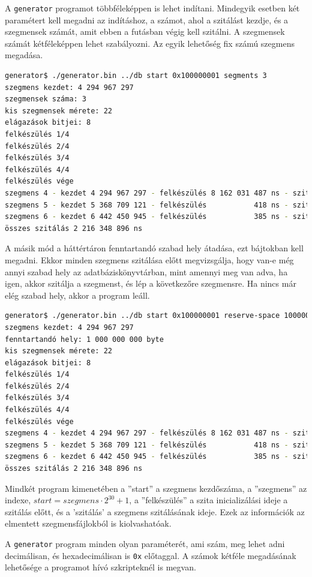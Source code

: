 A \texttt{generator} programot többféleképpen is lehet indítani.
Mindegyik esetben két paramétert kell megadni az indításhoz, a számot, ahol a szitálást kezdje, és a szegmensek számát, amit ebben a futásban végig kell szitálni.
A szegmensek számát kétféleképpen lehet szabályozni.
Az egyik lehetőség fix számú szegmens megadása.

\begin{lstlisting}[language=bash]
generator$ ./generator.bin ../db start 0x100000001 segments 3
szegmens kezdet: 4 294 967 297
szegmensek száma: 3
kis szegmensek mérete: 22
elágazások bitjei: 8
felkészülés 1/4
felkészülés 2/4
felkészülés 3/4
felkészülés 4/4
felkészülés vége
szegmens 4 - kezdet 4 294 967 297 - felkészülés 8 162 031 487 ns - szitálás 729 914 370 ns
szegmens 5 - kezdet 5 368 709 121 - felkészülés           418 ns - szitálás 736 412 117 ns
szegmens 6 - kezdet 6 442 450 945 - felkészülés           385 ns - szitálás 750 022 409 ns
összes szitálás 2 216 348 896 ns
\end{lstlisting}

A másik mód a háttértáron fenntartandó szabad hely átadása, ezt bájtokban kell megadni.
Ekkor minden szegmens szitálása előtt megvizsgálja, hogy van-e még annyi szabad hely az adatbáziskönyvtárban, mint amennyi meg van adva, ha igen, akkor szitálja a szegmenst,
és lép a következőre szegmensre. Ha nincs már elég szabad hely, akkor a program leáll.

\begin{lstlisting}[language=bash]
generator$ ./generator.bin ../db start 0x100000001 reserve-space 1000000000
szegmens kezdet: 4 294 967 297
fenntartandó hely: 1 000 000 000 byte 
kis szegmensek mérete: 22
elágazások bitjei: 8
felkészülés 1/4
felkészülés 2/4
felkészülés 3/4
felkészülés 4/4
felkészülés vége
szegmens 4 - kezdet 4 294 967 297 - felkészülés 8 162 031 487 ns - szitálás 729 914 370 ns
szegmens 5 - kezdet 5 368 709 121 - felkészülés           418 ns - szitálás 736 412 117 ns
szegmens 6 - kezdet 6 442 450 945 - felkészülés           385 ns - szitálás 750 022 409 ns
összes szitálás 2 216 348 896 ns
\end{lstlisting}

Mindkét program kimenetében a ''start'' a szegmens kezdőszáma, a ''szegmens'' az indexe,
$start=szegmens \cdot 2^{30}+1$, a ''felkészülés'' a szita inicializálási ideje a szitálás előtt,
és a 'szitálás' a szegmens szitálásának ideje.
Ezek az információk az elmentett szegmensfájlokból is kiolvashatóak.

A \texttt{generator} program minden olyan paraméterét, ami szám, meg lehet adni decimálisan, és hexadecimálisan is \texttt{0x} előtaggal.
A számok kétféle megadásának lehetősége a  programot hívó szkripteknél is megvan.

